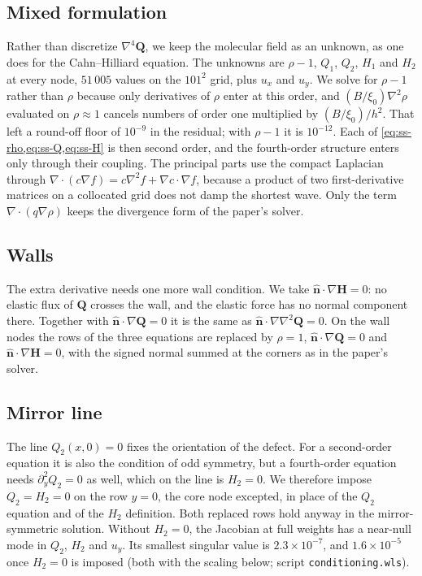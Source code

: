 \documentclass[11pt,a4paper]{article}
\newcommand{\Q}{\mathbf{Q}}
\renewcommand{\H}{\mathbf{H}}
\newcommand{\nh}{\hat{\bm{n}}}
\begin{document}
\subsection{Mixed formulation}
Rather than discretize $\nabla^4\Q$, we keep the molecular field
as an unknown, as one does for the Cahn--Hilliard equation. The unknowns are $\rho-1$,
$Q_1$, $Q_2$, $H_1$ and $H_2$ at every node, $51\,005$ values on the $101^2$ grid, plus
$u_x$ and $u_y$. We solve for $\rho-1$ rather than $\rho$ because only derivatives of $\rho$
enter at this order, and $(B/\xi_0)\nabla^2\rho$ evaluated on $\rho\approx1$ cancels numbers
of order one multiplied by $(B/\xi_0)/h^2$. That left a round-off floor of $10^{-9}$ in the
residual; with $\rho-1$ it is $10^{-12}$. Each of \cref{eq:ss-rho,eq:ss-Q,eq:ss-H} is then second order, and the fourth-order
structure enters only through their coupling. The principal parts use the compact
Laplacian through $\nabla\!\cdot\!(c\nabla f)=c\nabla^2f+\nabla c\cdot\nabla f$, because a
product of two first-derivative matrices on a collocated grid does not damp the shortest
wave. Only the term $\nabla\!\cdot\!(q\nabla\rho)$ keeps the divergence form of the paper's
solver.

\subsection{Walls}
The extra derivative needs one more wall condition. We take
$\nh\cdot\nabla\H=0$: no elastic flux of $\Q$ crosses the wall, and the elastic force has no
normal component there. Together with $\nh\cdot\nabla\Q=0$ it is the same as
$\nh\cdot\nabla\nabla^2\Q=0$. On the wall nodes the rows of the three equations are replaced
by $\rho=1$, $\nh\cdot\nabla\Q=0$ and $\nh\cdot\nabla\H=0$, with the signed normal summed at
the corners as in the paper's solver.

\subsection{Mirror line}
The line $Q_2(x,0)=0$ fixes the orientation of the defect. For a
second-order equation it is also the condition of odd symmetry, but a fourth-order equation
needs $\partial_y^2Q_2=0$ as well, which on the line is $H_2=0$. We therefore impose
$Q_2=H_2=0$ on the row $y=0$, the core node excepted, in place of the $Q_2$ equation and of
the $H_2$ definition. Both replaced rows hold anyway in the mirror-symmetric solution.
Without $H_2=0$, the Jacobian at full weights has a near-null mode in $Q_2$, $H_2$ and $u_y$.
Its smallest singular value is $2.3\times10^{-7}$, and $1.6\times10^{-5}$ once $H_2=0$ is
imposed (both with the scaling below; script \texttt{conditioning.wls}).
\end{document}
